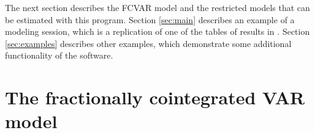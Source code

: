 \documentclass[article]{jss}
\begin{document}




The next section describes the FCVAR model and the restricted models that can be estimated with this program. Section \ref{sec:main} describes an example of a modeling session, which is a replication of one of the tables of results in \cite{JNP2014}. Section \ref{sec:examples} describes other examples, which demonstrate some additional functionality of the software. 



\section{The fractionally cointegrated VAR model} \label{sec:fcvar}

\end{document}

